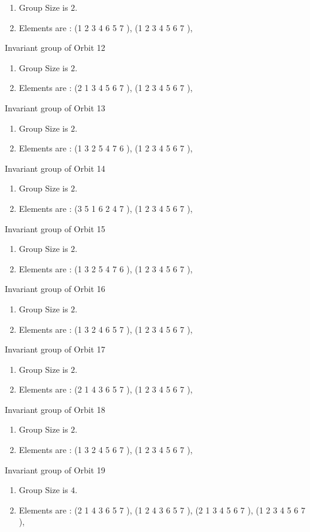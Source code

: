\documentclass[12pt]{article}
\begin{document}
\begin{enumerate}
\item Group Size is $2$.
\item Elements are : (1 2 3 4 6 5 7  ), (1 2 3 4 5 6 7  ), 
\end{enumerate}
Invariant group of Orbit 12
\begin{enumerate}
\item Group Size is $2$.
\item Elements are : (2 1 3 4 5 6 7  ), (1 2 3 4 5 6 7  ), 
\end{enumerate}
Invariant group of Orbit 13
\begin{enumerate}
\item Group Size is $2$.
\item Elements are : (1 3 2 5 4 7 6  ), (1 2 3 4 5 6 7  ), 
\end{enumerate}
Invariant group of Orbit 14
\begin{enumerate}
\item Group Size is $2$.
\item Elements are : (3 5 1 6 2 4 7  ), (1 2 3 4 5 6 7  ), 
\end{enumerate}
Invariant group of Orbit 15
\begin{enumerate}
\item Group Size is $2$.
\item Elements are : (1 3 2 5 4 7 6  ), (1 2 3 4 5 6 7  ), 
\end{enumerate}
Invariant group of Orbit 16
\begin{enumerate}
\item Group Size is $2$.
\item Elements are : (1 3 2 4 6 5 7  ), (1 2 3 4 5 6 7  ), 
\end{enumerate}
Invariant group of Orbit 17
\begin{enumerate}
\item Group Size is $2$.
\item Elements are : (2 1 4 3 6 5 7  ), (1 2 3 4 5 6 7  ), 
\end{enumerate}
Invariant group of Orbit 18
\begin{enumerate}
\item Group Size is $2$.
\item Elements are : (1 3 2 4 5 6 7  ), (1 2 3 4 5 6 7  ), 
\end{enumerate}
Invariant group of Orbit 19
\begin{enumerate}
\item Group Size is $4$.
\item Elements are : (2 1 4 3 6 5 7  ), (1 2 4 3 6 5 7  ), (2 1 3 4 5 6 7  ), (1 2 3 4 5 6 7  ), 
\end{enumerate}
\end{document}
